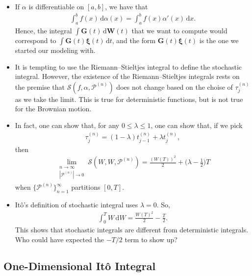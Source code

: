 \documentclass[10pt]{article}
\newcommand{\dee}{\mathrm{d}}
\newcommand{\ve}[1]{\mathbf{#1}}
\newcommand{\ves}[1]{\boldsymbol{#1}}
\newcommand{\mcal}[1]{\mathcal{#1}}
\begin{document}
\begin{itemize}
  \item If $\alpha$ is differentiable on $[a,b]$, we have that
  \begin{align*}
    \int_a^b f(x)\, \dee\alpha(x) = \int_a^b f(x)\alpha'(x)\, \dee x.
  \end{align*}
  Hence, the integral $\int \ve{G}(t)\, \dee\ve{W}(t)$ that we want to compute would correspond to $\int \ve{G}(t)\ves{\xi}(t) \, \dee t$, and the form $\ve{G}(t)\ves{\xi}(t)$ is the one we started our modeling with.

  \item It is tempting to use the Riemann--Stieltjes integral to define the stochastic integral. However, the existence of the Riemann--Stieltjes integrals rests on the premise that $\mcal{S}(f, \alpha, \mcal{P}^{(n)})$ does not change based on the choise of $\tau^{(n)}_j$ as we take the limit. This is true for deterministic functions, but is not true for the Brownian motion.
  
  \item In fact, one can show that, for any $0 \leq \lambda \leq 1$, one can show that, if we pick
  \begin{align*}
    \tau_{j}^{(n)} = (1-\lambda) t_{j-1}^{(n)} + \lambda t_{j}^{(n)},
  \end{align*}
  then
  \begin{align*}
    \lim_{\substack{ n \rightarrow \infty \\ |\mcal{P}^{(n)}| \rightarrow 0 }} \mcal{S}(W, W, \mcal{P}^{(n)}) = \frac{(W(T))^2}{2} + \bigg( \lambda - \frac{1}{2} \bigg) T
  \end{align*}
  when $\{ \mcal{P}^{(n)} \}_{n=1}^\infty$ partitions $[0,T]$.

  \item It\^{o}'s definition of stochastic integral uses $\lambda = 0$. So, 
  \begin{align*}
    \int_0^T W\, \dee W = \frac{W(T)^2}{2} - \frac{T}{2}.
  \end{align*}
  This shows that stochastic integrals are different from deterministic integrals. Who could have expected the $-T/2$ term to show up?  
\end{itemize}

\subsection{One-Dimensional It\^{o} Integral}
\end{document}

